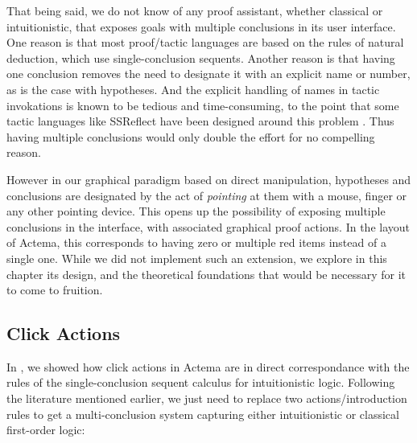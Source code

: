 That being said, we do not know of any proof assistant, whether classical or
intuitionistic, that exposes goals with multiple conclusions in its user
interface. One reason is that most proof/tactic languages are based on the rules
of natural deduction, which use single-conclusion sequents. Another reason is
that having one conclusion removes the need to designate it with an explicit
name or number, as is the case with hypotheses. And the explicit handling of
names in tactic invokations is known to be tedious and time-consuming, to the
point that some tactic languages like SSReflect have been designed around this
problem . Thus having multiple conclusions would only double the
effort for no compelling reason.

However in our graphical paradigm based on direct manipulation, hypotheses and
conclusions are designated by the act of \emph{pointing} at them with a mouse,
finger or any other pointing device. This opens up the possibility of exposing
multiple conclusions in the interface, with associated graphical proof actions.
In the layout of Actema, this corresponds to having zero or multiple red items
instead of a single one. While we did not implement such an extension, we
explore in this chapter its design, and the theoretical foundations that would
be necessary for it to come to fruition.

\subsection{Click Actions}

In , we showed how click actions in Actema are in direct
correspondance with the rules of the single-conclusion sequent calculus 
for intuitionistic logic. Following the literature mentioned earlier, we just
need to replace two actions/introduction rules to get a multi-conclusion system
capturing either intuitionistic or classical first-order logic:

